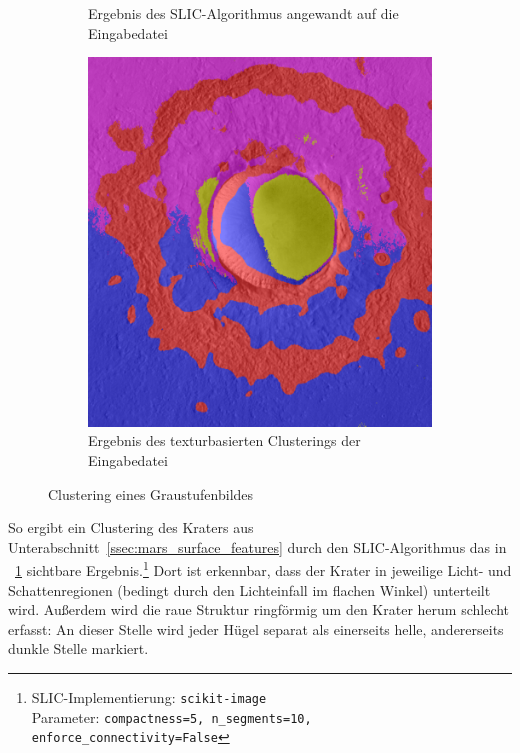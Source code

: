 \begin{figure}[h!]
\begin{subfigure}[t]{0.32\textwidth}
		\captionsetup{format=plain,width=0.85\textwidth}
		\caption{Ergebnis des SLIC-Algorithmus angewandt auf die Eingabedatei}
		\label{fig:slic_vs_tsugf_slic}
	\end{subfigure}
	\hfill
	\begin{subfigure}[t]{0.32\textwidth}
		\centering
		\includegraphics[width=\textwidth,keepaspectratio]{images/gen/slic_vs_tsugf/Gre13_01.jpg_tsugf.png}
		\captionsetup{format=plain,width=0.85\textwidth}
		\caption{Ergebnis des texturbasierten Clusterings der Eingabedatei}
		\label{fig:slic_vs_tsugf_tsugf}
	\end{subfigure}
	\caption{Clustering eines Graustufenbildes}
\end{figure}

So ergibt ein Clustering des Kraters aus Unterabschnitt~\ref{ssec:mars_surface_features} durch den SLIC-Algorithmus \cite{achanta_10} das in \figurename~\ref{fig:slic_vs_tsugf_slic} sichtbare Ergebnis.\footnote{SLIC-Implementierung: \texttt{scikit-image}\\Parameter: \texttt{compactness=5, n\_segments=10, enforce\_connectivity=False}} Dort ist erkennbar, dass der Krater in jeweilige Licht- und Schattenregionen (bedingt durch den Lichteinfall im flachen Winkel) unterteilt wird. Außerdem wird die raue Struktur ringförmig um den Krater herum schlecht erfasst: An dieser Stelle wird jeder Hügel separat als einerseits helle, andererseits dunkle Stelle markiert. %


